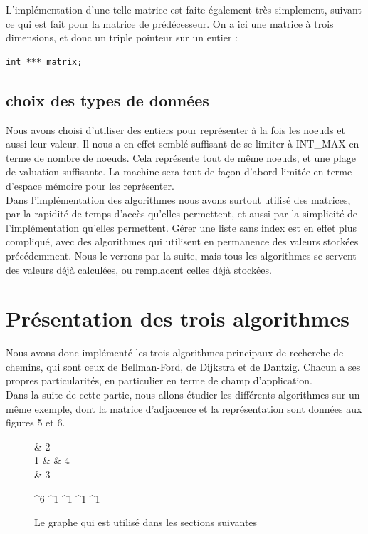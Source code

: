 \documentclass[a4paper,12pt,final] {article}
\begin{document}
L'implémentation d'une telle matrice est faite également très simplement, suivant ce qui est fait pour la matrice de prédécesseur. On a ici une matrice à trois dimensions, et donc un triple pointeur sur un entier :
\begin{lstlisting}
int *** matrix;
\end{lstlisting}

\subsection{choix des types de données}

Nous avons choisi d'utiliser des entiers pour représenter à la fois les noeuds et aussi leur valeur. Il nous a en effet semblé suffisant de se limiter à INT\_MAX en terme de nombre de noeuds. Cela représente tout de même  noeuds, et une plage de valuation suffisante. La machine sera tout de façon d'abord limitée en terme d'espace mémoire pour les représenter.\\

Dans l'implémentation des algorithmes nous avons surtout utilisé des matrices, par la rapidité de temps d'accès qu'elles permettent, et aussi par la simplicité de l'implémentation qu'elles permettent. Gérer une liste sans index est en effet plus compliqué, avec des algorithmes qui utilisent en permanence des valeurs stockées précédemment. Nous le verrons par la suite, mais tous les algorithmes se servent des valeurs déjà calculées, ou remplacent celles déjà stockées.\\

\newpage
\section{Présentation des trois algorithmes}

Nous avons donc implémenté les trois algorithmes principaux de recherche de chemins, qui sont ceux de Bellman-Ford, de Dijkstra et de Dantzig. Chacun a ses propres particularités, en particulier en terme de champ d'application.\\

Dans la suite de cette partie, nous allons étudier les différents algorithmes sur un même exemple, dont la matrice d'adjacence et la représentation sont données aux figures 5 et 6.\\ %

\begin{figure}[htpd]
 \centering
 \begin{psmatrix}[mnode=circle]
	    & 2\\
	 1 &    & 4\\
	    & 3\\
\end{psmatrix}
	
	^{6}
	^{1}
	^{1}
	^{1}
	^{1}

  \caption{Le graphe qui est utilisé dans les sections suivantes}
\end{figure}
\end{document}
